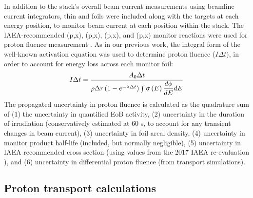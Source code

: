 In addition to the stack's overall beam current measurements using  beamline current integrators, thin  and  foils were included along with the  targets at each energy position, to monitor beam current at each position within the stack.
The IAEA-recommended (p,x), (p,x),  (p,x), and (p,x) monitor reactions were used for  proton fluence measurement 
\cite{Hermanne2018}.
As in our previous work, the integral form of the well-known activation equation was used to  determine proton fluence ($I \Delta t $),
in order to account for energy loss across each monitor foil:
\begin{equation}
I \Delta t = \dfrac{A_0 \Delta t}{\rho \Delta r \left( 1-e^{-\lambda \Delta t}\right) \int \sigma\left( E\right) \dfrac{d\phi}{dE} dE}
\end{equation}
The propagated uncertainty in proton fluence is calculated as the quadrature sum of (1) the uncertainty in quantified EoB activity, (2) uncertainty in the duration of irradiation (conservatively estimated at 60 s, to account for any transient changes in beam current), (3) uncertainty in foil areal density, (4) uncertainty in monitor product half-life (included, but normally negligible), (5) uncertainty in IAEA recommended cross section (using values  from the 2017 IAEA re-evaluation  \cite{Hermanne2018}), and (6) uncertainty in differential proton fluence (from transport simulations).






\subsection{\label{sec:proton_transport_fe}Proton transport calculations}

